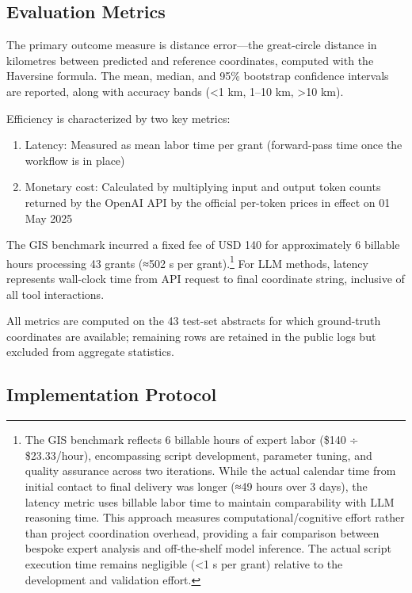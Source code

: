 \subsection{Evaluation Metrics}\label{evaluation-metrics}

The primary outcome measure is distance error---the great-circle
distance in kilometres between predicted and reference coordinates,
computed with the Haversine formula. The mean, median, and 95\%
bootstrap confidence intervals are reported, along with accuracy bands
(\textless1 km, 1--10 km, \textgreater10 km).

Efficiency is characterized by two key metrics:

\begin{enumerate}
\def\labelenumi{\arabic{enumi}.}
\tightlist
\item
  Latency: Measured as mean labor time per grant (forward-pass time once
  the workflow is in place)
\item
  Monetary cost: Calculated by multiplying input and output token counts
  returned by the OpenAI API by the official per-token prices in effect
  on 01 May 2025
\end{enumerate}

The GIS benchmark incurred a fixed fee of USD 140 for approximately 6
billable hours processing 43 grants (≈502 s per grant).\footnote{The GIS
  benchmark reflects 6 billable hours of expert labor (\$140 ÷
  \$23.33/hour), encompassing script development, parameter tuning, and
  quality assurance across two iterations. While the actual calendar
  time from initial contact to final delivery was longer (≈49 hours over
  3 days), the latency metric uses billable labor time to maintain
  comparability with LLM reasoning time. This approach measures
  computational/cognitive effort rather than project coordination
  overhead, providing a fair comparison between bespoke expert analysis
  and off-the-shelf model inference. The actual script execution time
  remains negligible (\textless1 s per grant) relative to the
  development and validation effort.} For LLM methods, latency
represents wall-clock time from API request to final coordinate string,
inclusive of all tool interactions.

All metrics are computed on the 43 test-set abstracts for which
ground-truth coordinates are available; remaining rows are retained in
the public logs but excluded from aggregate statistics.

\subsection{Implementation Protocol}\label{implementation-protocol}

